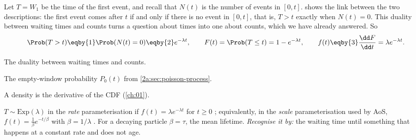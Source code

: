 Let $T=W_1$ be the time of the first event, and recall that $N(t)$ is the number of events in $[0,t]$.  shows the link between the two descriptions: the first event comes after $t$ if and only if there is no event in $[0,t]$, that is, $T>t$ exactly when $N(t)=0$. This duality between waiting times and counts turns a question about times into one about counts, which we have already answered. So
\begin{align}
  \Prob(T>t) \eqby{1} \Prob(N(t)=0) \eqby{2} e^{-\lambda t},\qquad
  F(t)=\Prob(T\le t)=1-e^{-\lambda t},\qquad
  f(t) \eqby{3} \frac{\dd F}{\dd t}=\lambda e^{-\lambda t}. \label{2a:eq:expo}
\end{align}
\begin{explain}
  \item The duality between waiting times and counts.
  \item The empty-window probability $P_0(t)$ from \cref{2a:sec:poisson-process}.
  \item A density is the derivative of the CDF (\cref{ch:01}).
\end{explain}

\begin{workdef}
$T\sim\mathrm{Exp}(\lambda)$ in the \emph{rate} parameterisation if $f(t)=\lambda e^{-\lambda t}$ for $t\ge0$ ; equivalently, in the \emph{scale} parameterisation used by AoS, $f(t)=\frac1\beta e^{-t/\beta}$ with $\beta=1/\lambda$ . For a decaying particle $\beta=\tau$, the mean lifetime.
\emph{Recognise it by:} the waiting time until something that happens at a constant rate and does not age.
\end{workdef}


